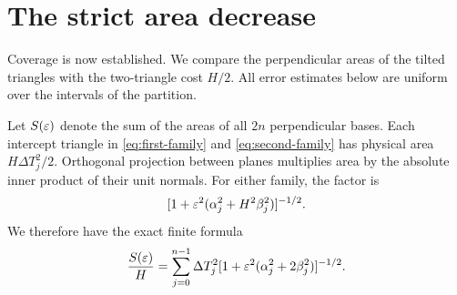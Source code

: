 \section{The strict area decrease}\label{sec:area}

Coverage is now established. We compare the perpendicular areas of the
tilted triangles with the two-triangle cost $H/2$. All error estimates below
are uniform over the intervals of the partition.

Let $S(\varepsilon)$ denote the sum of the areas of all $2n$ perpendicular bases.
Each intercept triangle in \eqref{eq:first-family} and \eqref{eq:second-family} has physical area $H\Delta T_j^2/2$.
Orthogonal projection between planes multiplies area by the absolute inner product of their unit normals.
For either family, the factor is
\[
 [1+\varepsilon^2(\alpha_j^2+H^2\beta_j^2)]^{-1/2}.
\]
We therefore have the exact finite formula
\begin{equation}\label{eq:exact-area-sum}
 \frac{S(\varepsilon)}H=
 \sum_{j=0}^{n-1}\Delta T_j^2
   [1+\varepsilon^2(\alpha_j^2+2\beta_j^2)]^{-1/2}.
\end{equation}

